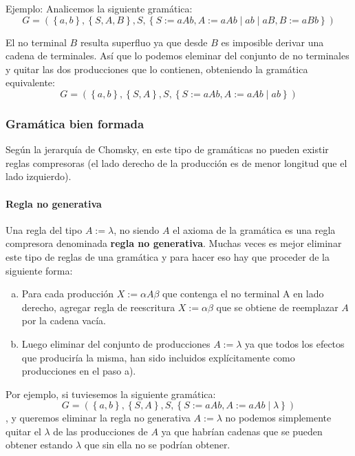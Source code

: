 \documentclass[12pt]{article}
\begin{document}
Ejemplo: Analicemos la siguiente gramática:
\[
G = \left(\left\{a, b\right\}, \left\{S,A,B\right\}, S, \left\{S:=aAb, A:=aAb \mid ab \mid aB, B:=aBb\right\}\right)
\]

El no terminal $ B $ resulta superfluo ya que desde $ B $ es imposible derivar una cadena de terminales. Así que lo podemos eleminar del conjunto de no terminales y quitar las dos producciones que lo contienen, obteniendo la gramática equivalente:
\[
G = \left(\left\{a,b\right\},\left\{S,A\right\},S,\left\{S:=aAb,A:=aAb \mid ab\right\}\right)
\]

\vspace{0.2cm}

\subsubsection{Gramática bien formada}
Según la jerarquía de Chomsky, en este tipo de gramáticas no pueden existir reglas compresoras (el lado derecho de la producción es de menor longitud que el lado izquierdo). 

\paragraph{Regla no generativa}\mbox{}

Una regla del tipo $ A:=\lambda $, no siendo $ A $ el axioma de la gramática es una regla compresora denominada \textbf{regla no generativa}. Muchas veces es mejor eliminar este tipo de reglas de una gramática y para hacer eso hay que proceder de la siguiente forma:
\begin{enumerate}[a)]
  \item Para cada producción $ X:=\alpha A \beta $ que contenga el no terminal A en lado derecho, agregar regla de reescritura $ X:=\alpha\beta $ que se obtiene de reemplazar $ A $ por la cadena vacía.

  \item Luego eliminar del conjunto de producciones $ A:=\lambda $ ya que todos los efectos que produciría la misma, han sido incluidos explícitamente como producciones en el paso a).
\end{enumerate}

Por ejemplo, si tuviesemos la siguiente gramática:
\[
G = \left(\left\{a,b\right\}, \left\{S,A\right\},S,\left\{S:=aAb, A:=aAb \mid \lambda\right\}\right)
\]
, y queremos eliminar la regla no generativa $ A:=\lambda $ no podemos simplemente quitar el $ \lambda $ de las producciones de $ A $ ya que habrían cadenas que se pueden obtener estando $ \lambda $ que sin ella no se podrían obtener.
\end{document}

